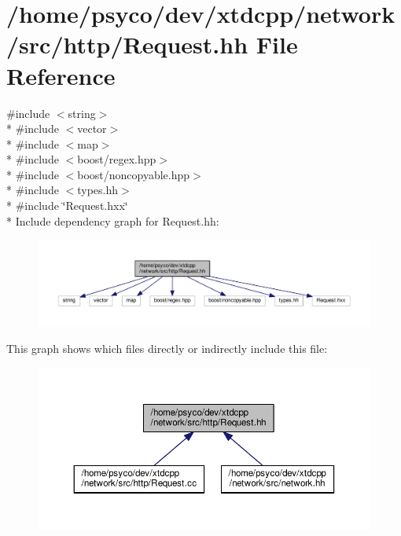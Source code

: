 \hypertarget{Request_8hh}{}\section{/home/psyco/dev/xtdcpp/network/src/http/\+Request.hh File Reference}
\label{Request_8hh}
{\ttfamily \#include $<$string$>$}\\*
{\ttfamily \#include $<$vector$>$}\\*
{\ttfamily \#include $<$map$>$}\\*
{\ttfamily \#include $<$boost/regex.\+hpp$>$}\\*
{\ttfamily \#include $<$boost/noncopyable.\+hpp$>$}\\*
{\ttfamily \#include $<$types.\+hh$>$}\\*
{\ttfamily \#include \char`\"{}Request.\+hxx\char`\"{}}\\*
Include dependency graph for Request.\+hh\+:
\nopagebreak
\begin{figure}[H]
\begin{center}
\leavevmode
\includegraphics[width=350pt]{Request_8hh__incl}
\end{center}
\end{figure}
This graph shows which files directly or indirectly include this file\+:
\nopagebreak
\begin{figure}[H]
\begin{center}
\leavevmode
\includegraphics[width=350pt]{Request_8hh__dep__incl}
\end{center}
\end{figure}
